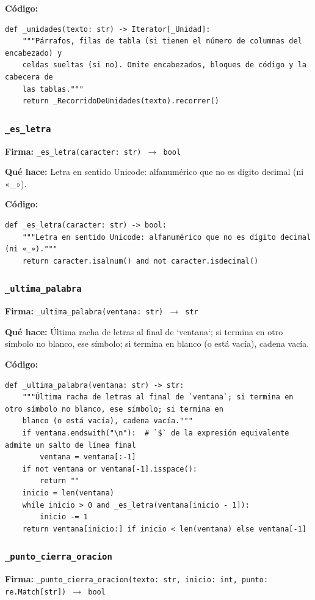 \documentclass[11pt,a4paper]{article}
\begin{document}
\textbf{Código:}
\begin{lstlisting}
def _unidades(texto: str) -> Iterator[_Unidad]:
    """Párrafos, filas de tabla (si tienen el número de columnas del encabezado) y
    celdas sueltas (si no). Omite encabezados, bloques de código y la cabecera de
    las tablas."""
    return _RecorridoDeUnidades(texto).recorrer()
\end{lstlisting}

\subsubsection*{\texttt{\_es\_letra}}
\textbf{Firma:} \texttt{\_es\_letra(caracter: str) $\rightarrow$ bool}

\textbf{Qué hace:} Letra en sentido Unicode: alfanumérico que no es dígito decimal (ni «\_»).

\textbf{Código:}
\begin{lstlisting}
def _es_letra(caracter: str) -> bool:
    """Letra en sentido Unicode: alfanumérico que no es dígito decimal (ni «_»)."""
    return caracter.isalnum() and not caracter.isdecimal()
\end{lstlisting}

\subsubsection*{\texttt{\_ultima\_palabra}}
\textbf{Firma:} \texttt{\_ultima\_palabra(ventana: str) $\rightarrow$ str}

\textbf{Qué hace:} Última racha de letras al final de `ventana`; si termina en otro símbolo no blanco, ese símbolo; si termina en
blanco (o está vacía), cadena vacía.

\textbf{Código:}
\begin{lstlisting}
def _ultima_palabra(ventana: str) -> str:
    """Última racha de letras al final de `ventana`; si termina en otro símbolo no blanco, ese símbolo; si termina en
    blanco (o está vacía), cadena vacía."""
    if ventana.endswith("\n"):  # `$` de la expresión equivalente admite un salto de línea final
        ventana = ventana[:-1]
    if not ventana or ventana[-1].isspace():
        return ""
    inicio = len(ventana)
    while inicio > 0 and _es_letra(ventana[inicio - 1]):
        inicio -= 1
    return ventana[inicio:] if inicio < len(ventana) else ventana[-1]
\end{lstlisting}

\subsubsection*{\texttt{\_punto\_cierra\_oracion}}
\textbf{Firma:} \texttt{\_punto\_cierra\_oracion(texto: str, inicio: int, punto: re.Match[str]) $\rightarrow$ bool}
\end{document}
